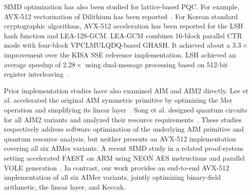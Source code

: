 SIMD optimization has also been studied for lattice-based PQC. For example, AVX-512 vectorization of Dilithium has been reported~\cite{xu2024optimizing}. For Korean standard cryptographic algorithms, AVX-512 acceleration has been reported for the LSH hash function and LEA-128-GCM. LEA-GCM combines 16-block parallel CTR mode with four-block VPCLMULQDQ-based GHASH. It achieved about a $3.3\times$ improvement over the KISA SSE reference implementation. LSH achieved an average speedup of $2.28\times$ using dual-message processing based on 512-bit register interleaving~\cite{lee2026advanced}.

Prior implementation studies have also examined AIM and AIM2 directly. Lee et al. accelerated the original AIM symmetric primitive by optimizing the Mer operation and simplifying its linear layer~\cite{lee2023high}. Song et al. designed quantum circuits for all AIM2 variants and analyzed their resource requirements~\cite{song2025quantum}. These studies respectively address software optimization of the underlying AIM primitive and quantum resource analysis, but neither presents an AVX-512 implementation covering all six AIMer variants. A recent SIMD study in a related proof-system setting accelerated FAEST on ARM using NEON AES instructions and parallel VOLE generation~\cite{lee2026accelerating}. In contrast, our work provides an end-to-end AVX-512 implementation of all six AIMer variants, jointly optimizing binary-field arithmetic, the linear layer, and Keccak.